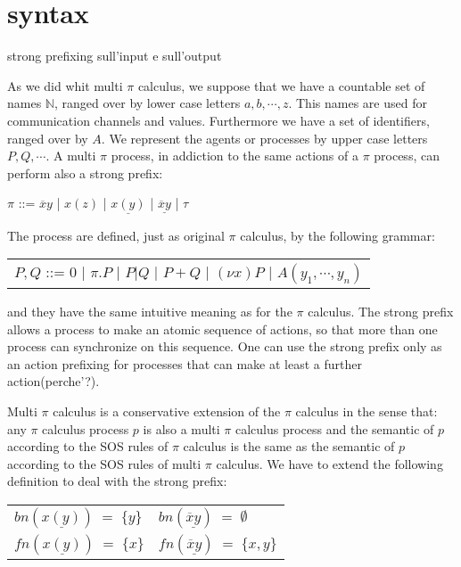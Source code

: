 
\section{syntax}

strong prefixing sull'input e sull'output


As we did whit multi $\pi$ calculus, we suppose that we have a countable set of names $\mathbb{N}$, ranged over by lower case letters $a,b, \cdots, z$. This names are used for communication channels and values. Furthermore we have a set of identifiers, ranged over by $A$. We represent the agents or processes by upper case letters $P,Q, \cdots $. A multi $\pi$ process, in addiction to the same actions of a $\pi$ process, can perform also a strong prefix:
\begin{center}
  $\pi$ ::= $\overline{x}y$ | $x(z)$ | $\underline{x(y)}$ | $\underline{\overline{x}y}$ | $\tau$ 
\end{center}
The process are defined, just as original $\pi$ calculus, by the following grammar:
\begin{center}
  \begin{tabular}{l}
    $P,Q$ ::= $0$ | $\pi.P$ | $P|Q$ | $P+Q$ | $(\nu x) P$ | $A(y_{1}, \cdots, y_{n})$
  \end{tabular}
\end{center}
and they have the same intuitive meaning as for the $\pi$ calculus. The strong prefix allows a process to make an atomic sequence of actions, so that more than one process can synchronize on this sequence. One can use the strong prefix only as an action prefixing for processes that can make at least a further action(perche'?).

Multi $\pi$ calculus is a conservative extension of the $\pi$ calculus in the sense that: any $\pi$ calculus process $p$ is also a multi $\pi$ calculus process and the semantic of $p$ according to the SOS rules of $\pi$ calculus is the same as the semantic of $p$ according to the SOS rules of multi $\pi$ calculus. 
We have to extend the following definition to deal with the strong prefix:
\begin{center}
  \begin{tabular}{ll}
	$bn(\underline{x(y)})\; =\; \{y\}$
      &
	$bn(\underline{\overline{x}y})\; =\; \emptyset$
    \\
	$fn(\underline{x(y)})\; =\; \{x\}$
      &
	$fn(\underline{\overline{x}y})\; =\; \{x,y\}$
    \\
  \end{tabular}
\end{center}


